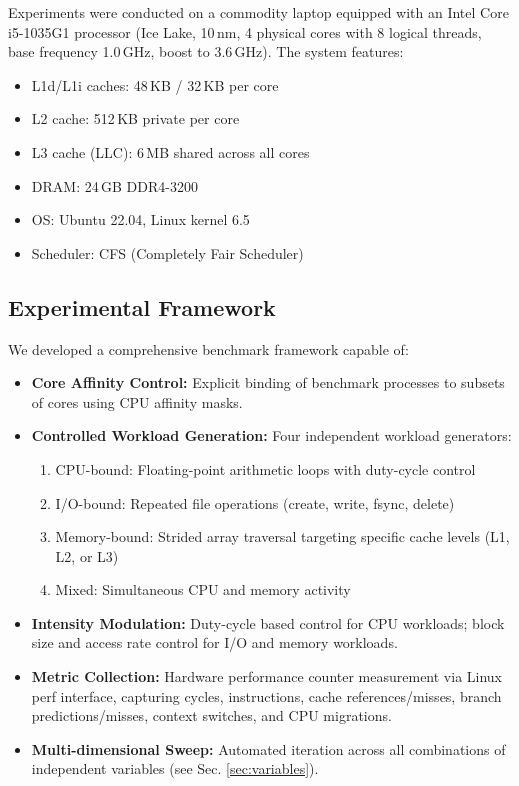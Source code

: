 \documentclass[conference]{IEEEtran}
\begin{document}
Experiments were conducted on a commodity laptop equipped with an Intel Core
i5-1035G1 processor (Ice Lake, 10\,nm, 4 physical cores with 8 logical threads,
base frequency 1.0\,GHz, boost to 3.6\,GHz). The system features:
\begin{itemize}
  \item L1d/L1i caches: 48\,KB / 32\,KB per core
  \item L2 cache: 512\,KB private per core
  \item L3 cache (LLC): 6\,MB shared across all cores
  \item DRAM: 24\,GB DDR4-3200
  \item OS: Ubuntu 22.04, Linux kernel 6.5
  \item Scheduler: CFS (Completely Fair Scheduler)
\end{itemize}

\subsection{Experimental Framework}

We developed a comprehensive benchmark framework capable of:

\begin{itemize}
  \item \textbf{Core Affinity Control:} Explicit binding of benchmark processes
        to subsets of cores using CPU affinity masks.
  
  \item \textbf{Controlled Workload Generation:} Four independent workload
        generators:
        \begin{enumerate}
          \item CPU-bound: Floating-point arithmetic loops with duty-cycle control
          \item I/O-bound: Repeated file operations (create, write, fsync, delete)
          \item Memory-bound: Strided array traversal targeting specific cache
                levels (L1, L2, or L3)
          \item Mixed: Simultaneous CPU and memory activity
        \end{enumerate}
  
  \item \textbf{Intensity Modulation:} Duty-cycle based control for CPU
        workloads; block size and access rate control for I/O and memory
        workloads.
  
  \item \textbf{Metric Collection:} Hardware performance counter measurement
        via Linux perf interface, capturing cycles, instructions, cache
        references/misses, branch predictions/misses, context switches, and
        CPU migrations.
  
  \item \textbf{Multi-dimensional Sweep:} Automated iteration across all
        combinations of independent variables (see Sec. \ref{sec:variables}).
\end{itemize}
\end{document}
